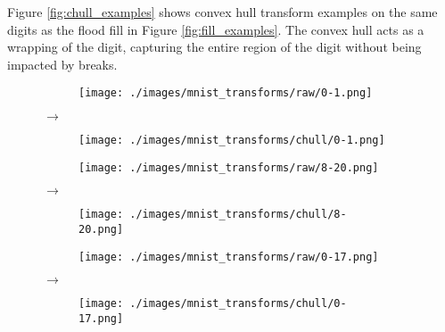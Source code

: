 Figure \ref{fig:chull_examples} shows convex hull transform examples on the same
digits as the flood fill in Figure \ref{fig:fill_examples}. The convex hull acts
as a wrapping of the digit, capturing the entire region of the digit without
being impacted by breaks.

\begin{figure}[H]
    \centering

    \begin{subfigure}{.15\columnwidth}
        \centering
        \texttt{[image: ./images/mnist\_transforms/raw/0-1.png]}
        \caption{}
        \label{fig:chull_orig1}
    \end{subfigure}%
    $\rightarrow$
    \begin{subfigure}{.15\columnwidth}
        \centering
        \texttt{[image: ./images/mnist\_transforms/chull/0-1.png]}
        \caption{}
        \label{fig:chull_transform1}
    \end{subfigure}

    \par\medskip

    \begin{subfigure}{.15\columnwidth}
        \centering
        \texttt{[image: ./images/mnist\_transforms/raw/8-20.png]}
        \caption{}
        \label{fig:chull_orig2}
    \end{subfigure}%
    $\rightarrow$
    \begin{subfigure}{.15\columnwidth}
        \centering
        \texttt{[image: ./images/mnist\_transforms/chull/8-20.png]}
        \caption{}
        \label{fig:chull_transform2}
    \end{subfigure}%

    \par\medskip

    \begin{subfigure}{.15\columnwidth}
        \centering
        \texttt{[image: ./images/mnist\_transforms/raw/0-17.png]}
        \caption{}
        \label{fig:chull_orig3}
    \end{subfigure}%
    $\rightarrow$
    \begin{subfigure}{.15\columnwidth}
        \centering
        \texttt{[image: ./images/mnist\_transforms/chull/0-17.png]}
        \caption{}
        \label{fig:chull_transform3}
    \end{subfigure}


\end{figure}
